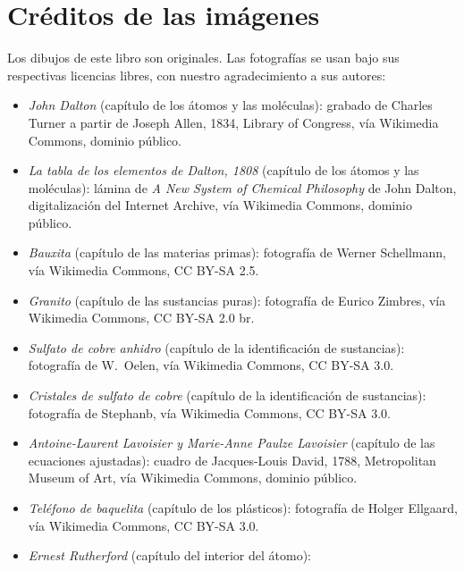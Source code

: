 \chapter*{Créditos de las imágenes}

Los dibujos de este libro son originales. Las fotografías se usan bajo
sus respectivas licencias libres, con nuestro agradecimiento a sus
autores:

\begin{itemize}
  \item \emph{John Dalton} (capítulo de los átomos y las moléculas):
        grabado de Charles Turner a partir de Joseph Allen, 1834, Library
        of Congress, vía Wikimedia Commons, dominio público.
  \item \emph{La tabla de los elementos de Dalton, 1808} (capítulo de los
        átomos y las moléculas): lámina de \emph{A New System of Chemical
        Philosophy} de John Dalton, digitalización del Internet Archive,
        vía Wikimedia Commons, dominio público.
  \item \emph{Bauxita} (capítulo de las materias primas): fotografía de
        Werner Schellmann, vía Wikimedia Commons, CC BY-SA 2.5.
  \item \emph{Granito} (capítulo de las sustancias puras): fotografía de
        Eurico Zimbres, vía Wikimedia Commons, CC BY-SA 2.0 br.
  \item \emph{Sulfato de cobre anhidro} (capítulo de la identificación de
        sustancias): fotografía de W.~Oelen, vía Wikimedia Commons,
        CC BY-SA 3.0.
  \item \emph{Cristales de sulfato de cobre} (capítulo de la
        identificación de sustancias): fotografía de Stephanb, vía
        Wikimedia Commons, CC BY-SA 3.0.
  \item \emph{Antoine-Laurent Lavoisier y Marie-Anne Paulze Lavoisier}
        (capítulo de las ecuaciones ajustadas): cuadro de Jacques-Louis
        David, 1788, Metropolitan Museum of Art, vía Wikimedia Commons,
        dominio público.
  \item \emph{Teléfono de baquelita} (capítulo de los plásticos):
        fotografía de Holger Ellgaard, vía Wikimedia Commons,
        CC BY-SA 3.0.
  \item \emph{Ernest Rutherford} (capítulo del interior del átomo):

\end{itemize}
